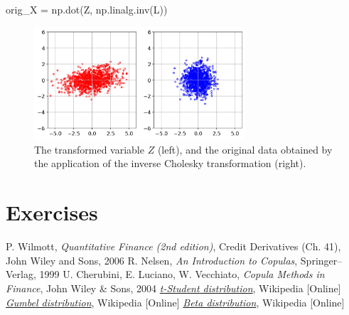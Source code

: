 \begin{ipython}
orig_X = np.dot(Z, np.linalg.inv(L))
\end{ipython}

\begin{figure}[htbp]
  \centering
  \includegraphics[width=0.7\textwidth]{figures/cholesky_inv}
  \caption{The transformed variable $Z$ (left), and the original data obtained by the application of the inverse Cholesky transformation (right).}
  \label{fig:cholesky_inv}
\end{figure}

\section{Exercises}


\begin{thebibliography}{9}
P. Wilmott, \emph{Quantitative Finance (2nd edition)}, Credit Derivatives (Ch. 41), John Wiley and Sons, 2006 
R. Nelsen, \emph{An Introduction to Copulas}, Springer–Verlag, 1999
U. Cherubini, E. Luciano, W. Vecchiato, \emph{Copula Methods in Finance}, John Wiley \& Sons, 2004
\href{https://en.wikipedia.org/wiki/Student\%27s\_t-distribution}{\emph{t-Student distribution}}, Wikipedia [Online]
\href{https://en.wikipedia.org/wiki/Gumbel_distribution}{\emph{Gumbel distribution}}, Wikipedia [Online]
\href{https://en.wikipedia.org/wiki/Beta_distribution}{\emph{Beta distribution}}, Wikipedia [Online]
\end{thebibliography}
